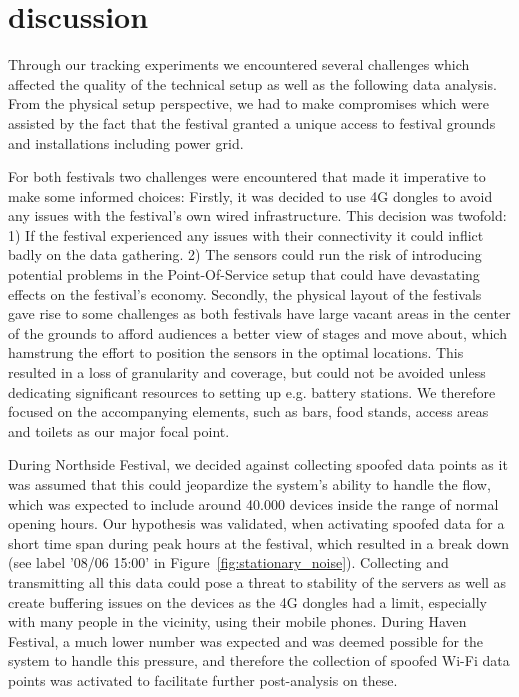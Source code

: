 \section{discussion}
Through our tracking experiments we encountered several challenges which affected the quality of the technical setup as well as the following data analysis. From the physical setup perspective, we had to make compromises which were assisted by the fact that the festival granted a unique access to festival grounds and installations including power grid.

For both festivals two challenges were encountered that made it imperative to make some informed choices: Firstly, it was decided to use 4G dongles to avoid any issues with the festival’s own wired infrastructure. This decision was twofold: 1) If the festival experienced any issues with their connectivity it could inflict badly on the data gathering. 2) The sensors could run the risk of introducing potential problems in the Point-Of-Service setup that could have devastating effects on the festival's economy. Secondly, the physical layout of the festivals gave rise to some challenges as both festivals have large vacant areas in the center of the grounds to afford audiences a better view of stages and move about, which hamstrung the effort to position the sensors in the optimal locations. This resulted in a loss of granularity and coverage, but could not be avoided unless dedicating significant resources to setting up e.g. battery stations. We therefore focused on the accompanying elements, such as bars, food stands, access areas and toilets as our major focal point.

During Northside Festival, we decided against collecting spoofed data points as it was assumed that this could jeopardize the system’s ability to handle the flow, which was expected to include around 40.000 devices inside the range of normal opening hours. Our hypothesis was validated, when activating spoofed data for a short time span during peak hours at the festival, which resulted in a break down (see label '08/06 15:00' in Figure~\ref{fig:stationary_noise}). Collecting and transmitting all this data could pose a threat to stability of the servers as well as create buffering issues on the devices as the 4G dongles had a limit, especially with many people in the vicinity, using their mobile phones. During Haven Festival, a much lower number was expected and was deemed possible for the system to handle this pressure, and therefore the collection of spoofed Wi-Fi data points was activated to facilitate further post-analysis on these. 

